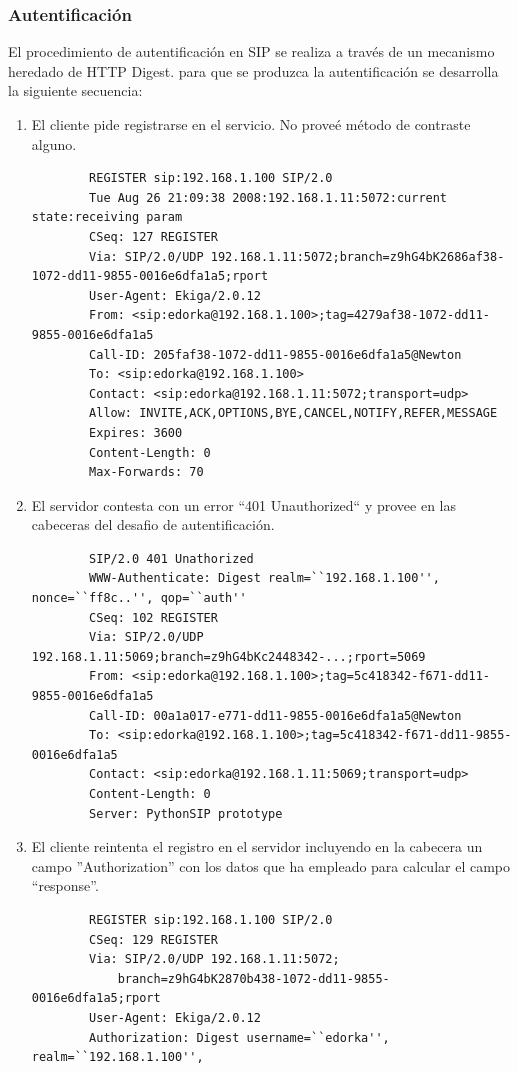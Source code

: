 \documentclass[a4paper,spanish,12pt]{book}
\begin{document}
\subsubsection{Autentificación}
El procedimiento de autentificación en SIP se realiza a trav\'es de un mecanismo heredado de HTTP Digest. para que se produzca la autentificación se desarrolla la siguiente secuencia:
\begin{enumerate}
	\item El cliente pide registrarse en el servicio. No prove\'e m\'etodo de contraste alguno.
		\scriptsize
		\begin{verbatim}
		REGISTER sip:192.168.1.100 SIP/2.0
		Tue Aug 26 21:09:38 2008:192.168.1.11:5072:current state:receiving param
		CSeq: 127 REGISTER
		Via: SIP/2.0/UDP 192.168.1.11:5072;branch=z9hG4bK2686af38-1072-dd11-9855-0016e6dfa1a5;rport
		User-Agent: Ekiga/2.0.12
		From: <sip:edorka@192.168.1.100>;tag=4279af38-1072-dd11-9855-0016e6dfa1a5
		Call-ID: 205faf38-1072-dd11-9855-0016e6dfa1a5@Newton
		To: <sip:edorka@192.168.1.100>
		Contact: <sip:edorka@192.168.1.11:5072;transport=udp>
		Allow: INVITE,ACK,OPTIONS,BYE,CANCEL,NOTIFY,REFER,MESSAGE
		Expires: 3600
		Content-Length: 0
		Max-Forwards: 70
		\end{verbatim}
		\normalsize
	\item El servidor contesta con un error ``401 Unauthorized`` y provee en las cabeceras del desafio de autentificación.
		\scriptsize
		\begin{verbatim}
		SIP/2.0 401 Unathorized
		WWW-Authenticate: Digest realm=``192.168.1.100'', nonce=``ff8c..'', qop=``auth''
		CSeq: 102 REGISTER
		Via: SIP/2.0/UDP 192.168.1.11:5069;branch=z9hG4bKc2448342-...;rport=5069
		From: <sip:edorka@192.168.1.100>;tag=5c418342-f671-dd11-9855-0016e6dfa1a5
		Call-ID: 00a1a017-e771-dd11-9855-0016e6dfa1a5@Newton
		To: <sip:edorka@192.168.1.100>;tag=5c418342-f671-dd11-9855-0016e6dfa1a5
		Contact: <sip:edorka@192.168.1.11:5069;transport=udp>
		Content-Length: 0
		Server: PythonSIP prototype
		\end{verbatim}
		\normalsize
	\item El cliente reintenta el registro en el servidor incluyendo en la cabecera un campo ''Authorization'' con los datos que ha empleado para calcular el campo ``response''.
		\scriptsize
		\begin{verbatim}
		REGISTER sip:192.168.1.100 SIP/2.0
		CSeq: 129 REGISTER
		Via: SIP/2.0/UDP 192.168.1.11:5072;
			branch=z9hG4bK2870b438-1072-dd11-9855-0016e6dfa1a5;rport
		User-Agent: Ekiga/2.0.12
		Authorization: Digest username=``edorka'', realm=``192.168.1.100'', 

\end{verbatim}
\end{enumerate}
\end{document}
